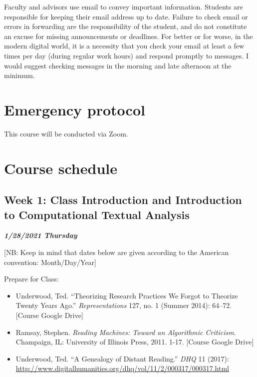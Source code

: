 \documentclass[
]{book}
\providecommand{\tightlist}{%
  \setlength{\itemsep}{0pt}\setlength{\parskip}{0pt}}
\begin{document}
Faculty and advisors use email to convey important information. Students are responsible for keeping their email address up to date. Failure to check email or errors in forwarding are the responsibility of the student, and do not constitute an excuse for missing announcements or deadlines. For better or for worse, in the modern digital world, it is a necessity that you check your email at least a few times per day (during regular work hours) and respond promptly to messages. I would suggest checking messages in the morning and late afternoon at the minimum.

\hypertarget{emergency-protocol}{%
\section{Emergency protocol}\label{emergency-protocol}}

This course will be conducted via Zoom.

\hypertarget{course-schedule}{%
\section{Course schedule}\label{course-schedule}}

\hypertarget{week-1-class-introduction-and-introduction-to-computational-textual-analysis}{%
\subsection{Week 1: Class Introduction and Introduction to Computational Textual Analysis}\label{week-1-class-introduction-and-introduction-to-computational-textual-analysis}}

\textbf{\emph{1/28/2021 Thursday}}

{[}NB: Keep in mind that dates below are given according to the American convention: Month/Day/Year{]}

Prepare for Class:

\begin{itemize}
\tightlist
\item
  Underwood, Ted. ``Theorizing Research Practices We Forgot to Theorize Twenty Years Ago.'' \emph{Representations} 127, no. 1 (Summer 2014): 64--72. {[}Course Google Drive{]}
\item
  Ramsay, Stephen. \emph{Reading Machines: Toward an Algorithmic Criticism}. Champaign, IL: University of Illinois Press, 2011. 1-17. {[}Course Google Drive{]}
\item
  Underwood, Ted. ``A Genealogy of Distant Reading.'' \emph{DHQ} 11 (2017): \url{http://www.digitalhumanities.org/dhq/vol/11/2/000317/000317.html}
\end{itemize}
\end{document}
